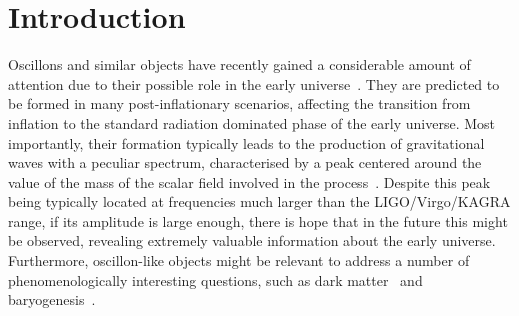 \documentclass[11pt,a4paper]{article}
\begin{document}

%

\tableofcontents

\section{Introduction}
\label{sec:Introduction}

Oscillons and similar objects have recently gained a considerable amount of attention due to their possible role in the early universe~\cite{1006.3075, 0712.3034, 1004.4658, astro-ph/9311037, 1002.3380, 1009.2505, 1103.1911, 1106.3335,  1710.06851, Antusch:2017vga, 1711.10496,  1902.07261, 1902.06736, Sang:2019ndv}. They are predicted to be formed in many post-inflationary scenarios, affecting the transition from inflation to the standard radiation dominated phase of the early universe. Most importantly, their formation typically leads to the production of gravitational waves with a peculiar spectrum, characterised by a peak centered around the value of the mass of the scalar field involved in the process~\cite{1304.6094, 1607.01314, 1707.09841, 1708.08922, 1803.08047}. Despite this peak being typically located at frequencies much larger than the LIGO/Virgo/KAGRA range, if its amplitude is large enough, there is hope that in the future this might be observed, revealing extremely valuable information about the early universe. Furthermore, oscillon-like objects might be relevant to address a number of phenomenologically interesting questions, such as dark matter~\cite{hep-ph/9303313, 1906.06352, 1909.11665, 1909.10805, 1912.07064, Boskovic:2018rub, Ferreira:2017pth, Annulli:2020lyc, Annulli:2020ilw, Khmelnitsky:2013lxt} and baryogenesis~\cite{1408.1811}.
\end{document}
